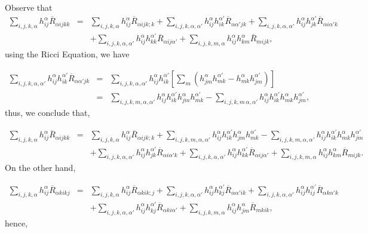 \documentclass[leqno,11pt]{amsart}
\theoremstyle{plain}
\theoremstyle{definition}
\numberwithin{equation}{section}
\begin{document}
Observe that 
\begin{eqnarray*}
\sum_{i,j,k,\alpha}h_{ij}^{\alpha}\overline{R}_{\alpha ijkk}&=&\sum_{i,j,k,\alpha}h_{ij}^{\alpha}\overline{R}_{\alpha ijk;k}+\sum_{i,j,k,\alpha,\alpha'}h_{ij}^{\alpha}h_{ik}^{\alpha'}\overline{R}_{\alpha \alpha' jk} +
\sum_{i,j,k,\alpha,\alpha'}h_{ij}^{\alpha}h_{jk}^{\alpha'}\overline{R}_{\alpha i\alpha' k}\\&&+\sum_{i,j,k,\alpha,\alpha'}h_{ij}^{\alpha}h_{kk}^{\alpha'}\overline{R}_{\alpha ij \alpha'} +\sum_{i,j,k,m,\alpha}h_{ij}^{\alpha}h_{km}^{\alpha}\overline{R}_{mijk},
\end{eqnarray*}
using the Ricci Equation, we have 

\begin{eqnarray*}
\sum_{i,j,k,\alpha,\alpha'}h_{ij}^{\alpha}h_{ik}^{\alpha'}\overline{R}_{\alpha \alpha' jk}&=&\sum_{i,j,k,\alpha,\alpha'}h_{ij}^{\alpha}h_{ik}^{\alpha'}\left[\sum_{m}(h_{jm}^{\alpha}h_{mk}^{\alpha'}-h_{mk}^{\alpha}h_{jm}^{\alpha'})\right]\\
&=&\sum_{i,j,k,m,\alpha,\alpha'}h_{ij}^{\alpha}h_{ik}^{\alpha'}h_{jm}^{\alpha}h_{mk}^{\alpha'}-\sum_{i,j,k,m\,\alpha,\alpha'}h_{ij}^{\alpha}h_{ik}^{\alpha'}h_{mk}^{\alpha}h_{jm}^{\alpha'},
\end{eqnarray*}
thus, we conclude that,

\begin{eqnarray*}
\sum_{i,j,k,\alpha}h_{ij}^{\alpha}\overline{R}_{\alpha ijkk}&=&\sum_{i,j,k,\alpha}h_{ij}^{\alpha}\overline{R}_{\alpha ijk;k}+\sum_{i,j,k,m,\alpha,\alpha'}h_{ij}^{\alpha}h_{ik}^{\alpha'}h_{jm}^{\alpha}h_{mk}^{\alpha'} - \sum_{i,j,k,m,\alpha,\alpha'}h_{ij}^{\alpha}h_{ik}^{\alpha'}h_{mk}^{\alpha}h_{jm}^{\alpha'}\\&&+\sum_{i,j,k,\alpha,\alpha'}h_{ij}^{\alpha}h_{jk}^{\alpha'}\overline{R}_{\alpha i\alpha' k}+\sum_{i,j,k,\alpha,\alpha'}h_{ij}^{\alpha}h_{kk}^{\alpha'}\overline{R}_{\alpha ij \alpha'} + \sum_{i,j,k,m,\alpha}h_{ij}^{\alpha}h_{km}^{\alpha}\overline{R}_{mijk}.
\end{eqnarray*}
On the other hand,

\begin{eqnarray*}
\sum_{i,j,k,\alpha}h_{ij}^{\alpha}\overline{R}_{\alpha kikj}&=&\sum_{i,j,k,\alpha}h_{ij}^{\alpha}\overline{R}_{\alpha kik;j}+\sum_{i,j,k,\alpha,\alpha'}h_{ij}^{\alpha}h_{kj}^{\alpha'}\overline{R}_{\alpha \alpha' ik}+\sum_{i,j,k,\alpha,\alpha'}h_{ij}^{\alpha}h_{ij}^{\alpha'}\overline{R}_{\alpha k \alpha' k}\\
&&+\sum_{i,j,k,\alpha,\alpha'}h_{ij}^{\alpha}h_{kj}^{\alpha'}\overline{R}_{\alpha ki \alpha'}+\sum_{i,j,k,m,\alpha}h_{ij}^{\alpha}h_{jm}^{\alpha}\overline{R}_{mkik},
\end{eqnarray*}
hence,
\end{document}
